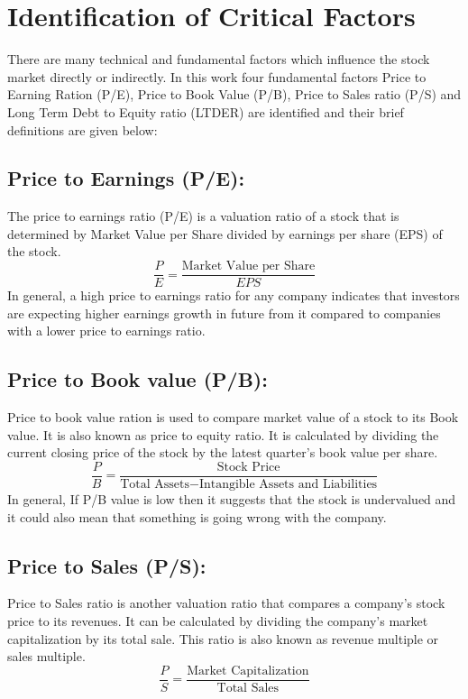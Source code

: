 \documentclass{elsarticle}
\begin{document}
\section{Identification of Critical Factors}  
There are many technical and fundamental factors which influence the stock market directly or indirectly. In this work four fundamental factors Price to Earning Ration (P/E), Price to Book Value (P/B), Price to Sales ratio (P/S) and Long Term Debt to Equity ratio (LTDER) are identified and their brief definitions are given below:

\subsection{Price to Earnings (P/E):}
The price to earnings ratio (P/E) is a valuation ratio of a stock that is determined by Market Value per Share divided by earnings per share (EPS) of the stock.
\begin{equation}
\frac{P}{E}=\frac{\textrm{Market Value per Share}}{EPS}
\end{equation}
In general, a high price to earnings ratio for any company indicates that investors are expecting higher earnings growth in future from it compared to companies with a lower price to earnings ratio.

\subsection{Price to Book value (P/B):}
Price to book value ration is used to compare market value of a stock to its Book value. It is also known as price to equity ratio. It is calculated by dividing the current closing price of the stock by the latest quarter's book value per share.
\begin{equation}
\frac{P}{B}=\frac{\textrm{Stock Price}}{\textrm{Total Assets}-\textrm{Intangible Assets and Liabilities}}
\end{equation}
In general, If P/B value is low then it suggests that the stock is undervalued and it could also mean that something is going wrong with the company.

\subsection{Price to Sales (P/S):}

Price to Sales ratio is another valuation ratio that compares a company's stock price to its revenues. It can be calculated by dividing the company's market capitalization by its total sale. This ratio is also known as revenue multiple or sales multiple.
\begin{equation}
\frac{P}{S}=\frac{\textrm{Market Capitalization}}{\textrm{Total Sales}}
\end{equation}
\end{document}
